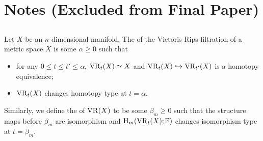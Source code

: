 \section{Notes (Excluded from Final Paper)}






\subsection{}

Let $X$ be an $n$-dimensional manifold.
The  of the Vietoris-Rips filtration of a metric space $X$ is some $\alpha\geq 0$ such that 
\begin{itemize}
    \item for any $0 \leq t\leq t'\leq \alpha$, $\operatorname{VR}_t(X)\simeq X$ and $\operatorname{VR}_{t}(X) \hookrightarrow \operatorname{VR}_{t'}(X)$ is a homotopy equivalence;
    \item $\operatorname{VR}_t(X)$ changes homotopy type at $t=\alpha$.
\end{itemize}
Similarly, we define the  of $\operatorname{VR}(X)$ to be some $\beta_m\geq 0$ such that the structure maps before $\beta_m$ are isomorphism and $\mathrm{H}_m(\operatorname{VR}_t(X); \mathbb{F})$ changes isomorphism type at $t = \beta_m$.

